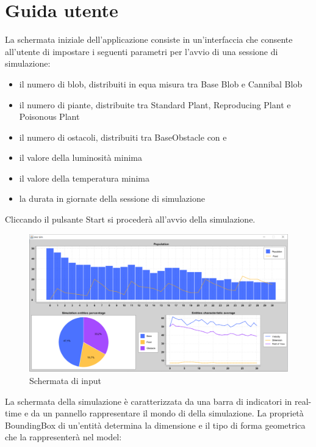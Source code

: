 \chapter{Guida utente}

La schermata iniziale dell'applicazione consiste in un'interfaccia che consente all'utente di impostare i seguenti parametri per l'avvio di una sessione di simulazione:
\begin{itemize}
\item il numero di blob, distribuiti in equa misura tra Base Blob e Cannibal Blob
\item il numero di piante, distribuite tra Standard Plant, Reproducing Plant e Poisonous Plant
\item il numero di ostacoli, distribuiti tra BaseObstacle con  e 
\item il valore della luminosità minima
\item il valore della temperatura minima
\item la durata in giornate della sessione di simulazione
\end{itemize}

Cliccando il pulsante Start si procederà all'avvio della simulazione.

\begin{figure}[h!]
\centering
\includegraphics[width=\textwidth, scale=0.44]{img/ResultsInterface.png}
\caption{Schermata di input}
\label{fig:ResultsInterface}
\end{figure}

La schermata della simulazione è caratterizzata da una barra di indicatori in real-time e da un pannello rappresentare il mondo di della simulazione. La proprietà BoundingBox di un'entità determina la dimensione e il tipo di forma geometrica che la rappresenterà nel model:


